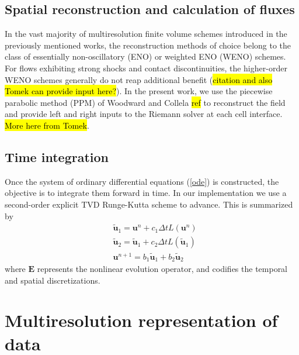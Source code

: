 \documentclass[]{article}
\begin{document}

    \subsection{Spatial reconstruction and calculation of fluxes}

        In the vast majority of multiresolution finite volume schemes 
        introduced in the previously mentioned works, the reconstruction
        methods of choice belong to the class of essentially non-oscillatory
        (ENO) or weighted ENO (WENO) schemes. For flows exhibiting strong
        shocks and contact discontinuities, the higher-order WENO schemes
        generally do not reap additional benefit (\hl{citation and also Tomek
        can provide input here?}). In the present work, we use the piecewise
        parabolic method (PPM) of Woodward and Collela \hl{ref} to reconstruct
        the field and provide left and right inputs to the Riemann solver at
        each cell interface. \hl{More here from Tomek}.

    \subsection{Time integration}

        Once the system of ordinary differential equations (\ref{ode}) is
        constructed, the objective is to integrate them forward in time. In our
        implementation we use a second-order explicit TVD Runge-Kutta scheme to
        advance. This is summarized by
        \begin{align}
            & \tilde{\bm{u}}_{1} = \bm{u}^{n} + c_{1} \Delta t L(\bm{u}^{n}) \\
            & \tilde{\bm{u}}_{2} = \tilde{\bm{u}}_{1} + c_{2} \Delta t L(\tilde{\bm{u}}_{1}) \\
            & \bm{u}^{n+1} = b_{1} \tilde{\bm{u}}_{1} + b_{2} \tilde{\bm{u}}_{2}
        \end{align}
        where $\bm{E}$ represents the nonlinear evolution operator, and codifies the
        temporal and spatial discretizations.

\section{Multiresolution representation of data}
\end{document}
